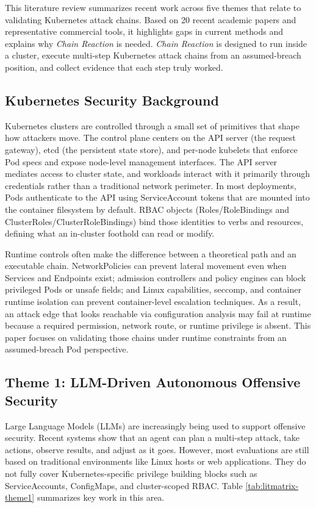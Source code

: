 \documentclass[conference]{IEEEtran}
\begin{document}
This literature review summarizes recent work across five themes that relate to validating Kubernetes attack chains. Based on 20 recent academic papers and representative commercial tools, it highlights gaps in current methods and explains why \emph{Chain Reaction} is needed. \emph{Chain Reaction} is designed to run inside a cluster, execute multi-step Kubernetes attack chains from an assumed-breach position, and collect evidence that each step truly worked.

\subsection{Kubernetes Security Background}
Kubernetes clusters are controlled through a small set of primitives that shape how attackers move. The control plane centers on the API server (the request gateway), etcd (the persistent state store), and per-node kubelets that enforce Pod specs and expose node-level management interfaces. The API server mediates access to cluster state, and workloads interact with it primarily through credentials rather than a traditional network perimeter. In most deployments, Pods authenticate to the API using ServiceAccount tokens that are mounted into the container filesystem by default. RBAC objects (Roles/RoleBindings and ClusterRoles/ClusterRoleBindings) bind those identities to verbs and resources, defining what an in-cluster foothold can read or modify.

Runtime controls often make the difference between a theoretical path and an executable chain. NetworkPolicies can prevent lateral movement even when Services and Endpoints exist; admission controllers and policy engines can block privileged Pods or unsafe fields; and Linux capabilities, seccomp, and container runtime isolation can prevent container-level escalation techniques. As a result, an attack edge that looks reachable via configuration analysis may fail at runtime because a required permission, network route, or runtime privilege is absent. This paper focuses on validating those chains under runtime constraints from an assumed-breach Pod perspective.

\subsection{Theme 1: LLM-Driven Autonomous Offensive Security}
Large Language Models (LLMs) are increasingly being used to support offensive security. Recent systems show that an agent can plan a multi-step attack, take actions, observe results, and adjust as it goes. However, most evaluations are still based on traditional environments like Linux hosts or web applications. They do not fully cover Kubernetes-specific privilege building blocks such as ServiceAccounts, ConfigMaps, and cluster-scoped RBAC. Table \ref{tab:litmatrix-theme1} summarizes key work in this area.
\end{document}
